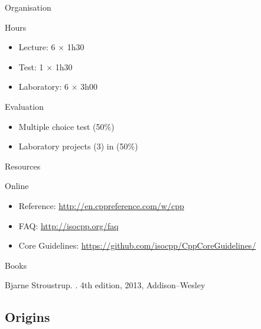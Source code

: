\begin{frame}{Organisation}{}
  \begin{block}{Hours}
    \begin{itemize}
    \item
      Lecture: 6 $\times$ 1h30
    \item
      Test: 1 $\times$ 1h30
    \item
      Laboratory: 6 $\times$ 3h00
    \end{itemize}
  \end{block}

  \begin{block}{Evaluation}
    \begin{itemize}
    \item
      Multiple choice test (50\%)
    \item
      Laboratory projects (3) in \CCLang (50\%)
    \end{itemize}
  \end{block}
\end{frame}

\begin{frame}{Resources}{}
  \begin{block}{Online}
    \begin{itemize}
    \item
      \CCLang Reference: \url{http://en.cppreference.com/w/cpp}
    \item
      \CCLang FAQ: \url{http://isocpp.org/faq}
    \item
      \CCLang Core Guidelines: \url{https://github.com/isocpp/CppCoreGuidelines/}
    \end{itemize}
  \end{block}

  \begin{block}{Books}
    \begin{thebibliography}{}
      Bjarne Stroustrup.
      .
      \newblock 4th edition, 2013, Addison--Wesley
    \end{thebibliography}
  \end{block}
\end{frame}

\subsection{\CCLang Origins}


